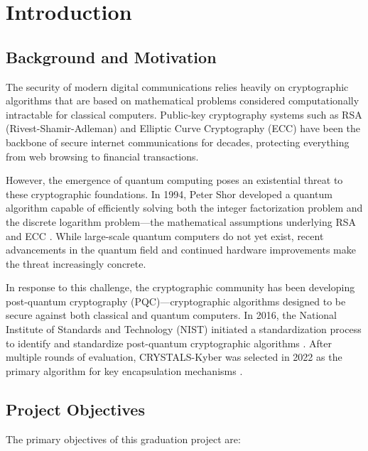 \chapter{Introduction}

\section{Background and Motivation}

The security of modern digital communications relies heavily on cryptographic algorithms that are based on mathematical problems considered computationally intractable for classical computers. Public-key cryptography systems such as RSA (Rivest-Shamir-Adleman) \cite{RSA1978} and Elliptic Curve Cryptography (ECC) \cite{Miller1985,Koblitz1987} have been the backbone of secure internet communications for decades, protecting everything from web browsing to financial transactions.

However, the emergence of quantum computing poses an existential threat to these cryptographic foundations. In 1994, Peter Shor developed a quantum algorithm capable of efficiently solving both the integer factorization problem and the discrete logarithm problem—the mathematical assumptions underlying RSA and ECC \cite{Shor1997}. While large-scale quantum computers do not yet exist, recent advancements in the quantum field \cite{Arute2019} and continued hardware improvements make the threat increasingly concrete.

In response to this challenge, the cryptographic community has been developing post-quantum cryptography (PQC)—cryptographic algorithms designed to be secure against both classical and quantum computers. In 2016, the National Institute of Standards and Technology (NIST) initiated a standardization process to identify and standardize post-quantum cryptographic algorithms \cite{NIST-PQC}. After multiple rounds of evaluation, CRYSTALS-Kyber was selected in 2022 as the primary algorithm for key encapsulation mechanisms \cite{NIST-Selection}.

\section{Project Objectives}

The primary objectives of this graduation project are:

